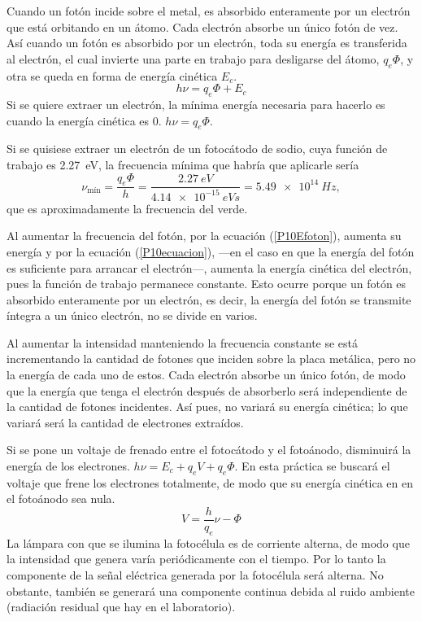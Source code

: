 \documentclass[12pt]{article}
\numberwithin{table}{section}
\numberwithin{figure}{section}
\numberwithin{equation}{section}
\begin{document}
Cuando un fotón incide sobre el metal, es absorbido enteramente por un electrón que está orbitando en un átomo. Cada electrón absorbe un único fotón de vez. Así cuando un fotón es absorbido por un electrón, toda su energía es transferida al electrón, el cual invierte una parte en trabajo para desligarse del átomo, $q_e\Phi$, y otra se queda en forma de energía cinética $E_c$.
\begin{equation}\label{P10ecuacion}
	h\nu=q_e\Phi+E_c
\end{equation}
Si se quiere extraer un electrón, la mínima energía necesaria para hacerlo es cuando la energía cinética es 0. $h\nu=q_e\Phi$.

Si se quisiese extraer un electrón de un fotocátodo de sodio, cuya función de trabajo es \SI{2.27}{eV}, la frecuencia mínima que habría que aplicarle sería
\begin{equation*}
	\nu_{\text{mín}}=\frac{q_e\Phi}{h}=\frac{ \SI{2.27}{eV} }{ \SI{4.14e-15}{eV s}}= \SI{5.49e14}{Hz},
\end{equation*}
que es aproximadamente la frecuencia del verde.

Al aumentar la frecuencia del fotón, por la ecuación (\ref{P10Efoton}), aumenta su energía y por la ecuación (\ref{P10ecuacion}), ---en el caso en que la energía del fotón es suficiente para arrancar el electrón---, aumenta la energía cinética del electrón, pues la función de trabajo permanece constante. Esto ocurre porque un fotón es absorbido enteramente por un electrón, es decir, la energía del fotón se transmite íntegra a un único electrón, no se divide en varios.

Al aumentar la intensidad manteniendo la frecuencia constante se está incrementando la cantidad de fotones que inciden sobre la placa metálica, pero no la energía de cada uno de estos. Cada electrón absorbe un único fotón, de modo que la energía que tenga el electrón después de absorberlo será independiente de la cantidad de fotones incidentes. Así pues, no variará su energía cinética; lo que variará será la cantidad de electrones extraídos.

Si se pone un voltaje de frenado entre el fotocátodo y el fotoánodo, disminuirá la energía de los electrones. $h\nu=E_c+q_eV+q_e\Phi$. En esta práctica se buscará el voltaje que frene los electrones totalmente, de modo que su energía cinética en en el fotoánodo sea nula.
\begin{equation}\label{P10regresion}
	V=\frac{h}{q_e}\nu-\Phi
\end{equation}
La lámpara con que se ilumina la fotocélula es de corriente alterna, de modo que la intensidad que genera varía periódicamente con el tiempo. Por lo tanto la componente de la señal eléctrica generada por la fotocélula será alterna. No obstante, también se generará una componente continua debida al ruido ambiente (radiación residual que hay en el laboratorio).
\end{document}
